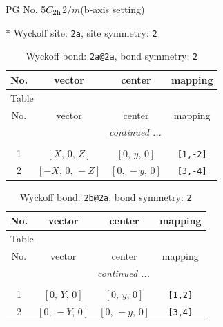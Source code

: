 \documentclass[fleqn,8pt]{jsarticle}
\begin{document}
\setcounter{MaxMatrixCols}{32}

\renewcommand{\tablename}{Table~}
\renewcommand{\figurename}{Figure~}
\begin{center}
\LARGE
PG No. 5\quad$C_{\rm 2h}$\quad$2/m$\quad(b-axis setting)\quad[ monoclinic ]
\end{center}


* Wyckoff site: {\tt 2a}, site symmetry: {\tt 2}
\renewcommand{\arraystretch}{1.2}
\begin{longtable}{cccc}
\caption{Wyckoff bond: {\tt 2a@2a}, bond symmetry: {\tt 2}}
 \\
 \hline \hline
No. & vector & center & mapping \\ \hline \endfirsthead

\multicolumn{3}{l}{\tablename\ \thetable{}} \\
 \hline \hline
No. & vector & center & mapping \\ \hline \endhead

 \hline \hline
\multicolumn{3}{r}{\footnotesize\it continued ...} \\ \endfoot

 \hline \hline
\multicolumn{3}{r}{} \\ \endlastfoot

1 & $\left[ X,\, 0,\, Z \right]$ & $\left[ 0,\, y,\, 0 \right]$ & {\tt [1,-2]} \\ \hline
2 & $\left[ - X,\, 0,\, - Z \right]$ & $\left[ 0,\, - y,\, 0 \right]$ & {\tt [3,-4]} \\
\end{longtable}
\renewcommand{\arraystretch}{1.2}
\begin{longtable}{cccc}
\caption{Wyckoff bond: {\tt 2b@2a}, bond symmetry: {\tt 2}}
 \\
 \hline \hline
No. & vector & center & mapping \\ \hline \endfirsthead

\multicolumn{3}{l}{\tablename\ \thetable{}} \\
 \hline \hline
No. & vector & center & mapping \\ \hline \endhead

 \hline \hline
\multicolumn{3}{r}{\footnotesize\it continued ...} \\ \endfoot

 \hline \hline
\multicolumn{3}{r}{} \\ \endlastfoot

1 & $\left[ 0,\, Y,\, 0 \right]$ & $\left[ 0,\, y,\, 0 \right]$ & {\tt [1,2]} \\ \hline
2 & $\left[ 0,\, - Y,\, 0 \right]$ & $\left[ 0,\, - y,\, 0 \right]$ & {\tt [3,4]} \\
\end{longtable}
\end{document}
